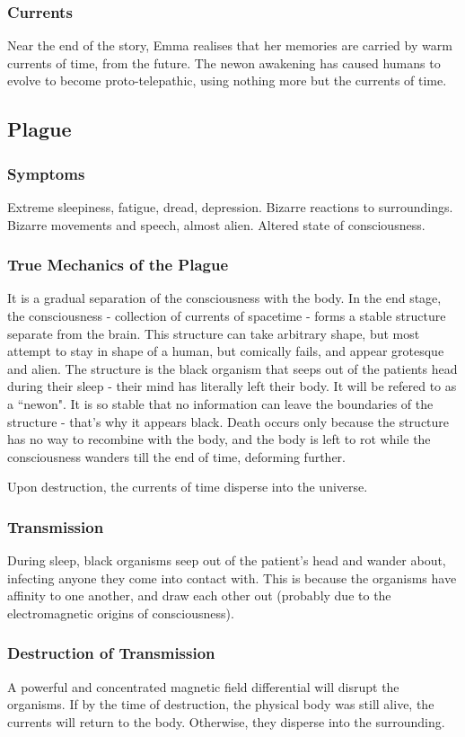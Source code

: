 \documentclass[11pt]{article}
\begin{document}
		\subsubsection{Currents}
		Near the end of the story, Emma realises that her memories are carried by warm currents of time, from the future. 
		The newon awakening has caused humans to evolve to become proto-telepathic, using nothing more but the currents of time.
	
	\subsection{Plague}
		\subsubsection{Symptoms}
		Extreme sleepiness, fatigue, dread, depression.
		Bizarre reactions to surroundings.
		Bizarre movements and speech, almost alien.
		Altered state of consciousness.
		\subsubsection{True Mechanics of the Plague}
		It is a gradual separation of the consciousness with the body. 
		In the end stage, the consciousness - collection of currents of spacetime - forms a stable structure separate from the brain.
		This structure can take arbitrary shape, but most attempt to stay in shape of a human, but comically fails, and appear grotesque and alien.
		The structure is the black organism that seeps out of the patients head during their sleep - their mind has literally left their body. It will be refered to as a ``newon".
		It is so stable that no information can leave the boundaries of the structure - that's why it appears black.
		Death occurs only because the structure has no way to recombine with the body, and the body is left to rot while the consciousness wanders till the end of time, deforming further.
		
		Upon destruction, the currents of time disperse into the universe.
		\subsubsection{Transmission}
		During sleep, black organisms seep out of the patient's head and wander about, infecting anyone they come into contact with.
		This is because the organisms have affinity to one another, and draw each other out (probably due to the electromagnetic origins of consciousness).
		\subsubsection{Destruction of Transmission}
		A powerful and concentrated magnetic field differential will disrupt the organisms.
		If by the time of destruction, the physical body was still alive, the currents will return to the body.
		Otherwise, they disperse into the surrounding.
\end{document}
